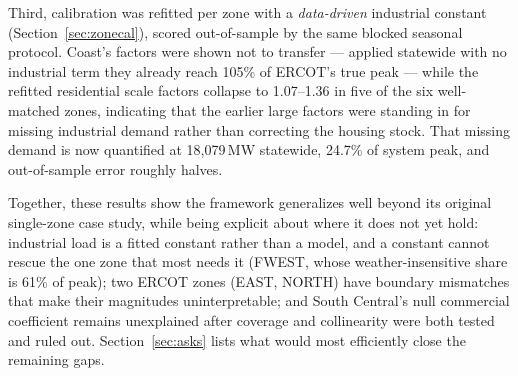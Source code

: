 \documentclass[11pt]{article}
\begin{document}
Third, calibration was refitted per zone with a \emph{data-driven} industrial constant
(Section~\ref{sec:zonecal}), scored out-of-sample by the same blocked seasonal protocol.
Coast's factors were shown not to transfer --- applied statewide with no industrial term
they already reach 105\% of ERCOT's true peak --- while the refitted residential scale
factors collapse to 1.07--1.36 in five of the six well-matched zones, indicating that the
earlier large factors were standing in for missing industrial demand rather than
correcting the housing stock. That missing
demand is now quantified at 18{,}079\,MW statewide, 24.7\% of system peak, and out-of-sample
error roughly halves.

Together, these results show the framework generalizes well beyond its original
single-zone case study, while being explicit about where it does not yet hold: industrial
load is a fitted constant rather than a model, and a constant cannot rescue the one zone
that most needs it (FWEST, whose weather-insensitive share is 61\% of peak); two ERCOT
zones (EAST, NORTH) have boundary mismatches that make their magnitudes uninterpretable;
and South Central's null commercial coefficient remains unexplained after coverage and
collinearity were both tested and ruled out. Section~\ref{sec:asks} lists what would most
efficiently close the remaining gaps.
\end{document}
